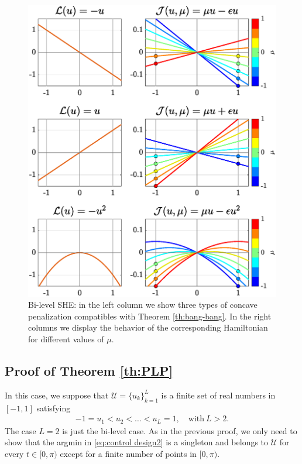 \documentclass[twocolumn]{autart}    %
\begin{document}
\begin{figure}[h] 
	\centering
	\includegraphics[scale=0.415]{img/fig03.eps}
	\caption{Bi-level SHE: in the left column we show three types of concave penalization compatibles with Theorem \ref{th:bang-bang}. In the right columns we display the behavior of the corresponding Hamiltonian for different values of $\mu$.}\label{fig:Bang-Bang-penalization} 
\end{figure}

\subsection{Proof of Theorem \ref{th:PLP}}\label{proof:PLP}

In this case, we suppose that $\mathcal{U} = \{ u_k\}_{k=1}^L$ is a finite set of real numbers in $[-1,1]$ satisfying
\begin{align}\label{eq:order} 
	-1 = u_1 < u_2 <\ldots <u_L = 1, \quad \text{with} \ L> 2.
\end{align} 
The case $L=2$ is just the bi-level case. As in the previous proof, we only need to show that the argmin in \eqref{eq:control design2} is a singleton and belongs to $\mathcal{U}$ for every $t\in [0,\pi)$ except for a finite number of points in $[0,\pi)$.
\end{document}
